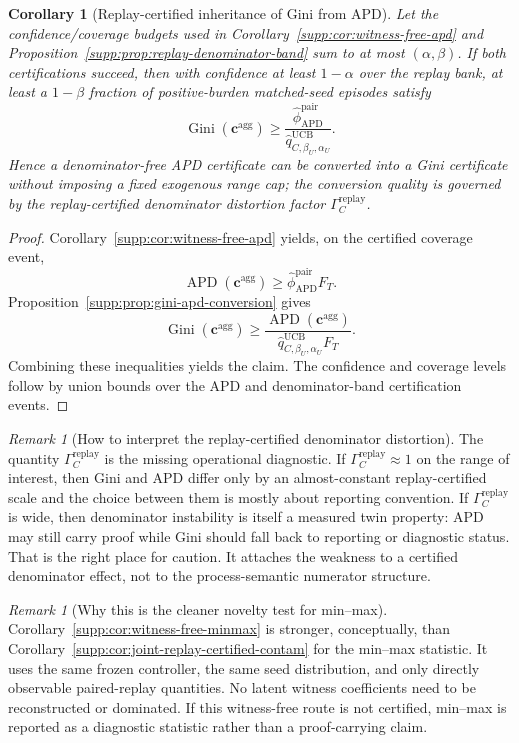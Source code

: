\documentclass[11pt]{article}
\newcommand{\1}{\mathbf{1}}
\newcommand{\Gini}{\operatorname{Gini}}
\newcommand{\APD}{\operatorname{APD}}
\theoremstyle{definition}
\theoremstyle{plain}
\newtheorem{corollary}[definition]{Corollary}
\theoremstyle{remark}
\newtheorem{remark}[definition]{Remark}
\begin{document}
\begin{corollary}[Replay-certified inheritance of Gini from APD]
\label{supp:cor:apd-to-gini}
Let the confidence/coverage budgets used in Corollary~\ref{supp:cor:witness-free-apd} and Proposition~\ref{supp:prop:replay-denominator-band} sum to at most $(\alpha,\beta)$. If both certifications succeed, then with confidence at least $1-\alpha$ over the replay bank, at least a $1-\beta$ fraction of positive-burden matched-seed episodes satisfy
\[
\Gini(\mathbf c^{\mathrm{agg}})
\ge
\frac{\widehat\phi_{\APD}^{\mathrm{pair}}}{\widehat q_{C,\beta_U,\alpha_U}^{\mathrm{UCB}}}.
\]
Hence a denominator-free APD certificate can be converted into a Gini certificate without imposing a fixed exogenous range cap; the conversion quality is governed by the replay-certified denominator distortion factor $\Gamma_C^{\mathrm{replay}}$.
\end{corollary}

\begin{proof}
Corollary~\ref{supp:cor:witness-free-apd} yields, on the certified coverage event,
\[
\APD(\mathbf c^{\mathrm{agg}})
\ge
\widehat\phi_{\APD}^{\mathrm{pair}} F_T.
\]
Proposition~\ref{supp:prop:gini-apd-conversion} gives
\[
\Gini(\mathbf c^{\mathrm{agg}})
\ge
\frac{\APD(\mathbf c^{\mathrm{agg}})}{\widehat q_{C,\beta_U,\alpha_U}^{\mathrm{UCB}} F_T}.
\]
Combining these inequalities yields the claim. The confidence and coverage levels follow by union bounds over the APD and denominator-band certification events.
\end{proof}

\begin{remark}[How to interpret the replay-certified denominator distortion]
\label{supp:rem:gini-apd-gap}
The quantity $\Gamma_C^{\mathrm{replay}}$ is the missing operational diagnostic. If $\Gamma_C^{\mathrm{replay}}\approx 1$ on the range of interest, then Gini and APD differ only by an almost-constant replay-certified scale and the choice between them is mostly about reporting convention. If $\Gamma_C^{\mathrm{replay}}$ is wide, then denominator instability is itself a measured twin property: APD may still carry proof while Gini should fall back to reporting or diagnostic status. That is the right place for caution. It attaches the weakness to a certified denominator effect, not to the process-semantic numerator structure.
\end{remark}

\begin{remark}[Why this is the cleaner novelty test for min--max]
\label{supp:rem:witness-free-minmax-novelty}
Corollary~\ref{supp:cor:witness-free-minmax} is stronger, conceptually, than Corollary~\ref{supp:cor:joint-replay-certified-contam} for the min--max statistic. It uses the same frozen controller, the same seed distribution, and only directly observable paired-replay quantities. No latent witness coefficients need to be reconstructed or dominated. If this witness-free route is not certified, min--max is reported as a diagnostic statistic rather than a proof-carrying claim.
\end{remark}
\end{document}
